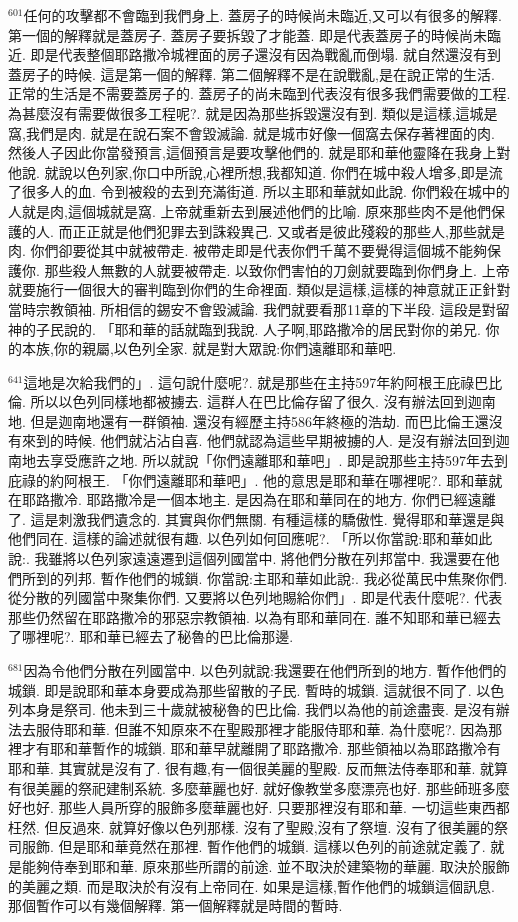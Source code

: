 \documentclass{book}
\begin{document}
$^{601}$任何的攻擊都不會臨到我們身上.
蓋房子的時候尚未臨近,又可以有很多的解釋.
第一個的解釋就是蓋房子.
蓋房子要拆毀了才能蓋.
即是代表蓋房子的時候尚未臨近.
即是代表整個耶路撒冷城裡面的房子還沒有因為戰亂而倒塌.
就自然還沒有到蓋房子的時候.
這是第一個的解釋.
第二個解釋不是在說戰亂,是在說正常的生活.
正常的生活是不需要蓋房子的.
蓋房子的尚未臨到代表沒有很多我們需要做的工程.
為甚麼沒有需要做很多工程呢?.
就是因為那些拆毀還沒有到.
類似是這樣,這城是窩,我們是肉.
就是在說石案不會毀滅論.
就是城市好像一個窩去保存著裡面的肉.
然後人子因此你當發預言,這個預言是要攻擊他們的.
就是耶和華他靈降在我身上對他說.
就說以色列家,你口中所說,心裡所想,我都知道.
你們在城中殺人增多,即是流了很多人的血.
令到被殺的去到充滿街道.
所以主耶和華就如此說.
你們殺在城中的人就是肉,這個城就是窩.
上帝就重新去到展述他們的比喻.
原來那些肉不是他們保護的人.
而正正就是他們犯罪去到誅殺異己.
又或者是彼此殘殺的那些人,那些就是肉.
你們卻要從其中就被帶走.
被帶走即是代表你們千萬不要覺得這個城不能夠保護你.
那些殺人無數的人就要被帶走.
以致你們害怕的刀劍就要臨到你們身上.
上帝就要施行一個很大的審判臨到你們的生命裡面.
類似是這樣,這樣的神意就正正針對當時宗教領袖.
所相信的錫安不會毀滅論.
我們就要看那11章的下半段.
這段是對留神的子民說的.
「耶和華的話就臨到我說.
人子啊,耶路撒冷的居民對你的弟兄.
你的本族,你的親屬,以色列全家.
就是對大眾說:你們遠離耶和華吧.

$^{641}$這地是次給我們的」.
這句說什麼呢?.
就是那些在主持597年約阿根王庇祿巴比倫.
所以以色列同樣地都被擄去.
這群人在巴比倫存留了很久.
沒有辦法回到迦南地.
但是迦南地還有一群領袖.
還沒有經歷主持586年終極的浩劫.
而巴比倫王還沒有來到的時候.
他們就沾沾自喜.
他們就認為這些早期被擄的人.
是沒有辦法回到迦南地去享受應許之地.
所以就說「你們遠離耶和華吧」.
即是說那些主持597年去到庇祿的約阿根王.
「你們遠離耶和華吧」.
他的意思是耶和華在哪裡呢?.
耶和華就在耶路撒冷.
耶路撒冷是一個本地主.
是因為在耶和華同在的地方.
你們已經遠離了.
這是刺激我們遺念的.
其實與你們無關.
有種這樣的驕傲性.
覺得耶和華還是與他們同在.
這樣的論述就很有趣.
以色列如何回應呢?.
「所以你當說:耶和華如此說:.
我雖將以色列家遠遠遷到這個列國當中.
將他們分散在列邦當中.
我還要在他們所到的列邦.
暫作他們的城鎖.
你當說:主耶和華如此說:.
我必從萬民中焦聚你們.
從分散的列國當中聚集你們.
又要將以色列地賜給你們」.
即是代表什麼呢?.
代表那些仍然留在耶路撒冷的邪惡宗教領袖.
以為有耶和華同在.
誰不知耶和華已經去了哪裡呢?.
耶和華已經去了秘魯的巴比倫那邊.

$^{681}$因為令他們分散在列國當中.
以色列就說:我還要在他們所到的地方.
暫作他們的城鎖.
即是說耶和華本身要成為那些留散的子民.
暫時的城鎖.
這就很不同了.
以色列本身是祭司.
他未到三十歲就被秘魯的巴比倫.
我們以為他的前途盡喪.
是沒有辦法去服侍耶和華.
但誰不知原來不在聖殿那裡才能服侍耶和華.
為什麼呢?.
因為那裡才有耶和華暫作的城鎖.
耶和華早就離開了耶路撒冷.
那些領袖以為耶路撒冷有耶和華.
其實就是沒有了.
很有趣,有一個很美麗的聖殿.
反而無法侍奉耶和華.
就算有很美麗的祭祀建制系統.
多麼華麗也好.
就好像教堂多麼漂亮也好.
那些師班多麼好也好.
那些人員所穿的服飾多麼華麗也好.
只要那裡沒有耶和華.
一切這些東西都枉然.
但反過來.
就算好像以色列那樣.
沒有了聖殿,沒有了祭壇.
沒有了很美麗的祭司服飾.
但是耶和華竟然在那裡.
暫作他們的城鎖.
這樣以色列的前途就定義了.
就是能夠侍奉到耶和華.
原來那些所謂的前途.
並不取決於建築物的華麗.
取決於服飾的美麗之類.
而是取決於有沒有上帝同在.
如果是這樣,暫作他們的城鎖這個訊息.
那個暫作可以有幾個解釋.
第一個解釋就是時間的暫時.
\end{document}
